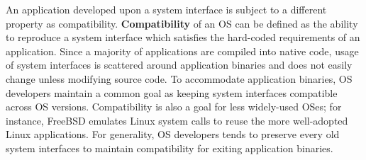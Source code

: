 



An application developed upon a system interface is subject to a different property as compatibility.
{\bf Compatibility} of an OS can be
defined as 
the ability to reproduce a system interface which satisfies the hard-coded requirements of an application.
Since a majority of applications are compiled into native code,
usage of system interfaces
is scattered around application binaries
and does not easily change unless modifying source code.
To accommodate application binaries,
OS developers maintain a common goal as keeping system interfaces
compatible across OS versions.
Compatibility is also a goal for less widely-used OSes; for instance, FreeBSD emulates Linux system calls to
reuse the more well-adopted Linux applications.
For generality, OS developers tends to preserve every old system interfaces
to maintain compatibility for exiting application binaries.

